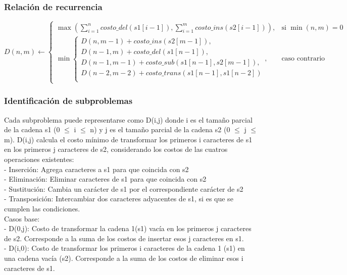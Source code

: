 \subsubsection{Relación de recurrencia}
$D(n,m) \leftarrow \begin{cases}
  				\max(\sum_{i=1}^{n} costo\_del(s1[i-1]), \sum_{i=1}^{m} costo\_ins(s2[i-1])), & \text{si } \min(n,m) = 0 \\
  				\min\begin{cases}
                        D(n,m-1) + costo\_ins(s2[m-1]),\\
                        D(n-1,m) + costo\_del(s1[n-1]),\\
                        D(n-1,m-1) + costo\_sub(s1[n-1],s2[m-1]),\\
                        D(n-2,m-2) + costo\_trans(s1[n-1],s1[n-2])\\
                    \end{cases}, & \text{caso contrario}
  			\end{cases}$
\subsubsection{Identificación de subproblemas}
Cada subproblema puede representarse como D(i,j) donde i es el tamaño parcial de la cadena  s1 (0 $\leq$ i $\leq$ n) y j es el tamaño parcial de la cadena s2 (0 $\leq$ j $\leq$ m).
D(i,j) calcula el costo mínimo de transformar los primeros i caracteres de s1 en los primeros j caracteres de s2, considerando los costos de las cuatros operaciones existentes: \\
- Inserción: Agrega caracteres a s1 para que coincida con s2\\
- Eliminación: Eliminar caracteres de s1 para que coincida con s2\\ 
- Sustitución: Cambia un carácter de s1 por el correspondiente carácter de s2\\
- Transposición: Intercambiar dos caracteres adyacentes de s1, si es que se cumplen las condiciones.\\
Casos base: \\
- D(0,j): Costo de transformar la cadena 1(s1) vacía en los primeros j caracteres de s2. Corresponde a la suma de los costos de insertar esos j caracteres en s1.\\
- D(i,0): Costo de transformar los primeros i caracteres de la cadena 1 (s1) en una cadena vacía (s2). Corresponde a la suma de los costos de eliminar esos i caracteres de s1.

